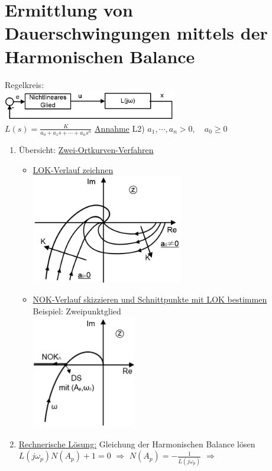 \documentclass[openany,a4paper,11pt]{book}
\begin{document}
\section[Ermittlung von Dauerschwingungen]{Ermittlung von Dauerschwingungen mittels der Harmonischen Balance}
Regelkreis:\\
\includegraphics[width=3in]{imgs/NLR55.png}\\
$L(s)=\frac{K}{a_0+a_1s+\cdots+a_ns^n}$  \uline{Annahme} L2) $a_1,\cdots,a_n>0,\quad a_0\ge0$ 
\begin{enumerate}
    \item Übersicht: \uline{Zwei-Ortkurven-Verfahren}\begin{itemize}
        \item \uline{LOK-Verlauf zeichnen}\\
        \includegraphics[width=2.6in]{imgs/NLR56.png}\\
        \item \uline{NOK-Verlauf skizzieren und Schnittpunkte mit LOK bestimmen}\\
        Beispiel: Zweipunktglied\\
        \includegraphics[width=1.8in]{imgs/NLR57.png}
    \end{itemize}
    \item \uline{Rechnerische Lösung:} Gleichung der Harmonischen Balance lösen\\
    $L(j\omega_p)N(A_p)+1=0$ $\Rightarrow$ $N(A_p)=-\frac{1}{L(j\omega_p)}$ $\Rightarrow$\\
\end{enumerate}
\end{document}
